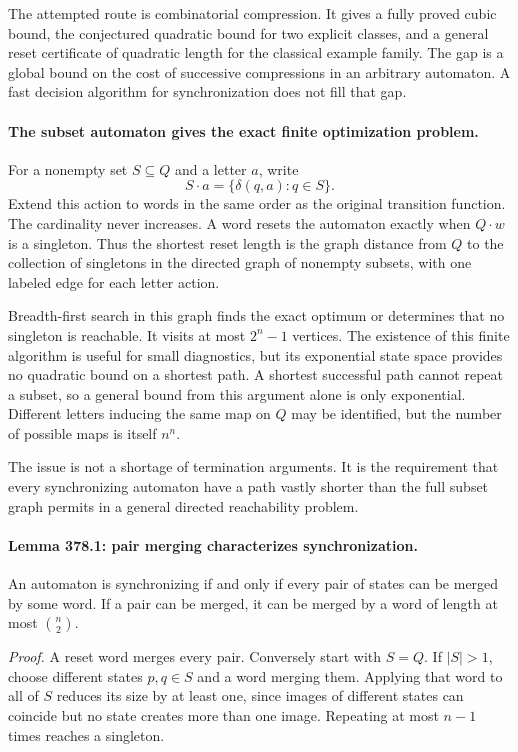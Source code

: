 \documentclass[11pt]{article}
\begin{document}
The attempted route is combinatorial compression. It gives a fully proved cubic bound, the conjectured quadratic bound for two explicit classes, and a general reset certificate of quadratic length for the classical example family. The gap is a global bound on the cost of successive compressions in an arbitrary automaton. A fast decision algorithm for synchronization does not fill that gap.

\paragraph{The subset automaton gives the exact finite optimization problem.}
For a nonempty set $S\subseteq Q$ and a letter $a$, write
\[
                       S\cdot a=\{\delta(q,a):q\in S\}.
\]
Extend this action to words in the same order as the original transition function. The cardinality never increases. A word resets the automaton exactly when $Q\cdot w$ is a singleton. Thus the shortest reset length is the graph distance from $Q$ to the collection of singletons in the directed graph of nonempty subsets, with one labeled edge for each letter action.

Breadth-first search in this graph finds the exact optimum or determines that no singleton is reachable. It visits at most $2^n-1$ vertices. The existence of this finite algorithm is useful for small diagnostics, but its exponential state space provides no quadratic bound on a shortest path. A shortest successful path cannot repeat a subset, so a general bound from this argument alone is only exponential. Different letters inducing the same map on $Q$ may be identified, but the number of possible maps is itself $n^n$.

The issue is not a shortage of termination arguments. It is the requirement that every synchronizing automaton have a path vastly shorter than the full subset graph permits in a general directed reachability problem.

\paragraph{Lemma 378.1: pair merging characterizes synchronization.}
An automaton is synchronizing if and only if every pair of states can be merged by some word. If a pair can be merged, it can be merged by a word of length at most $\binom n2$.

\emph{Proof.} A reset word merges every pair. Conversely start with $S=Q$. If $|S|>1$, choose different states $p,q\in S$ and a word merging them. Applying that word to all of $S$ reduces its size by at least one, since images of different states can coincide but no state creates more than one image. Repeating at most $n-1$ times reaches a singleton.
\end{document}
